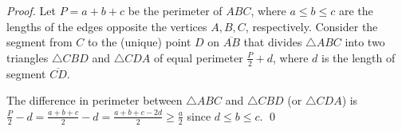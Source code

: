 \documentclass[orivec]{llncs}
\begin{document}
\begin{proof}
Let $P = a + b + c$ be the perimeter of $ABC$, where $a \leq b \leq c$ are the lengths of the edges opposite the vertices $A, B, C$, respectively.
Consider the segment from $C$ to the (unique) point $D$
on $\overline{AB}$ that divides $\triangle ABC$ into two triangles
$\triangle CBD$ and $\triangle CDA$ of equal perimeter $\frac{P}{2} + d$, where $d$ is the length
of segment $\overline{CD}$.

The difference in perimeter between $\triangle ABC$ and $\triangle CBD$ (or $\triangle CDA$)
is $\frac{P}{2} - d = \frac{a+b+c}{2} - d = \frac{a+b+c-2 d}{2} \geq \frac{a}{2}$
since $d \leq b \leq c$. \qed
\end{proof}
\end{document}
